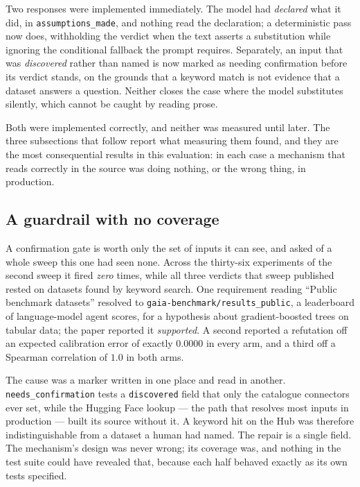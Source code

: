 Two responses were implemented immediately. The model had \emph{declared} what it
did, in \texttt{assumptions\_made}, and nothing read the declaration; a
deterministic pass now does, withholding the verdict when the text asserts a
substitution while ignoring the conditional fallback the prompt requires.
Separately, an input that was \emph{discovered} rather than named is now marked as
needing confirmation before its verdict stands, on the grounds that a keyword match
is not evidence that a dataset answers a question. Neither closes the case where the
model substitutes silently, which cannot be caught by reading prose.

Both were implemented correctly, and neither was measured until later. The three
subsections that follow report what measuring them found, and they are the most
consequential results in this evaluation: in each case a mechanism that reads
correctly in the source was doing nothing, or the wrong thing, in production.

\subsection{A guardrail with no coverage}
\label{sec:guardrail-coverage}

A confirmation gate is worth only the set of inputs it can see, and asked of a
whole sweep this one had seen none. Across the thirty-six experiments of the second
sweep it fired \emph{zero} times, while all three verdicts that sweep published
rested on datasets found by keyword search. One requirement reading ``Public
benchmark datasets'' resolved to \texttt{gaia-benchmark/results\_public}, a
leaderboard of language-model agent scores, for a hypothesis about gradient-boosted
trees on tabular data; the paper reported it \emph{supported}. A second reported a
refutation off an expected calibration error of exactly $0.0000$ in every arm, and
a third off a Spearman correlation of $1.0$ in both arms.

The cause was a marker written in one place and read in another.
\texttt{needs\_confirmation} tests a \texttt{discovered} field that only the
catalogue connectors ever set, while the Hugging Face lookup --- the path that
resolves most inputs in production --- built its source without it. A keyword hit on
the Hub was therefore indistinguishable from a dataset a human had named. The repair
is a single field. The mechanism's design was never wrong; its coverage was, and
nothing in the test suite could have revealed that, because each half behaved
exactly as its own tests specified.

